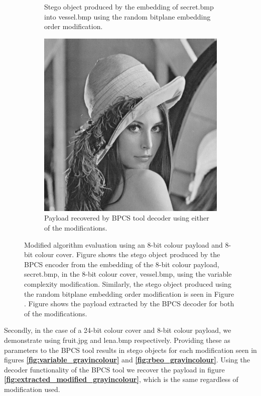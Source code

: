 \documentclass{l4proj}
\begin{document}
\begin{figure}[]
\begin{subfigure}[b]{0.3\textwidth}
        \caption{Stego object produced by the embedding of secret.bmp into vessel.bmp using the random bitplane embedding order modification.}
        \label{fig:rbeo_grayingray}
    \end{subfigure}
    \begin{subfigure}[b]{0.3\textwidth}
        \includegraphics[width=\textwidth]{images/lena.png}
        \caption{Payload recovered by BPCS tool decoder using either of the modifications.}
        \label{fig:extracted_modified_grayingray}
    \end{subfigure}
    \caption{Modified algorithm evaluation using an 8-bit colour payload and 8-bit colour cover. Figure  shows the stego object produced by the BPCS encoder from the embedding of the 8-bit colour payload, secret.bmp, in the 8-bit colour cover, vessel.bmp, using the variable complexity modification. Similarly, the stego object produced using the random bitplane embedding order modification is seen in Figure . Figure  shows the payload extracted by the BPCS decoder for both of the modifications.}
\end{figure}

Secondly, in the case of a 24-bit colour cover and 8-bit colour payload, we demonstrate using fruit.jpg and lena.bmp respectively. Providing these as parameters to the BPCS tool results in stego objects for each modification seen in figures \textbf{\ref{fig:variable_grayincolour}} and \textbf{\ref{fig:rbeo_grayincolour}}. Using the decoder functionality of the BPCS tool we recover the payload in figure \textbf{\ref{fig:extracted_modified_grayincolour}}, which is the same regardless of modification used.
\end{document}
